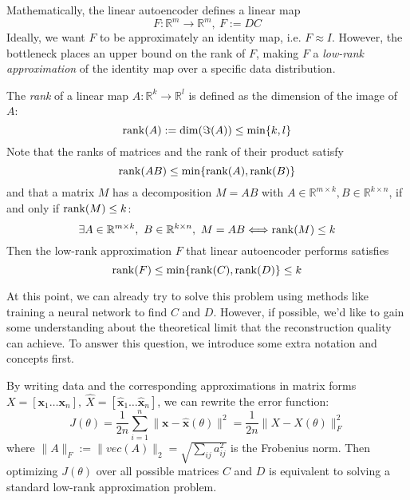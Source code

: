 \documentclass[../book-template.tex]{subfiles}
\begin{document}
\par Mathematically, the linear autoencoder defines a linear map 
\begin{equation*}
    F:\mathbb{R}^m \rightarrow \mathbb{R}^m,\ F:=DC
\end{equation*}
Ideally, we want $F$ to be approximately an identity map, i.e. $F\approx I$. However, the bottleneck places an upper bound on the rank of $F$, making $F$ a \emph{low-rank approximation} of the identity map over a specific data distribution.
\par The \emph{rank} of a linear map $A:\mathbb{R}^k\rightarrow \mathbb{R}^l$ is defined as the dimension of the image of $A$:
\begin{equation*}
    \operatorname{rank}(A):=\dim(\Im(A))\leq \min\{k,l\}
\end{equation*}
Note that the ranks of matrices and the rank of their product satisfy
\begin{equation*}
    \operatorname{rank}(AB)\leq \min\{\operatorname{rank}(A), \operatorname{rank}(B)\}
\end{equation*}
and that a matrix $M$ has a decomposition $M=AB$ with $A\in \mathbb{R}^{m\times k},B\in \mathbb{R}^{k\times n}$, if and only if $\operatorname{rank}(M)\leq k$:
\begin{equation*}
    \exists A\in \mathbb{R}^{m\times k},\ B\in \mathbb{R}^{k\times n},\ M=AB \Longleftrightarrow \operatorname{rank}(M)\leq k
\end{equation*}
Then the low-rank approximation $F$ that linear autoencoder performs satisfies
\begin{equation*}
    \operatorname{rank}(F)\leq \min\{\operatorname{rank}(C),\operatorname{rank}(D)\}\leq k
\end{equation*}
\par At this point, we can already try to solve this problem using methods like training a neural network to find $C$ and $D$. However, if possible, we'd like to gain some understanding about the theoretical limit that the reconstruction quality can achieve. To answer this question, we introduce some extra notation and concepts first.
\par By writing data and the corresponding approximations in matrix forms $X = [\bm{x}_1\dots \bm{x}_n],\ \hat{X} = [\hat{\bm{x}}_1\dots \hat{\bm{x}}_n]$, we can rewrite the error function:
\begin{equation*}
    J(\theta)=\frac{1}{2n}\sum_{i=1}^{n}\|\bm{x}-\hat{\bm{x}}(\theta)\|^2=\frac{1}{2n}\|X-\hat{X}(\theta)\|^2_F
\end{equation*}
where $\|A\|_F:=\|vec(A)\|_2=\sqrt{\sum_{ij}a_{ij}^2}$ is the Frobenius norm. Then optimizing $J(\theta)$ over all possible matrices $C$ and $D$ is equivalent to solving a standard low-rank approximation problem.
\end{document}
